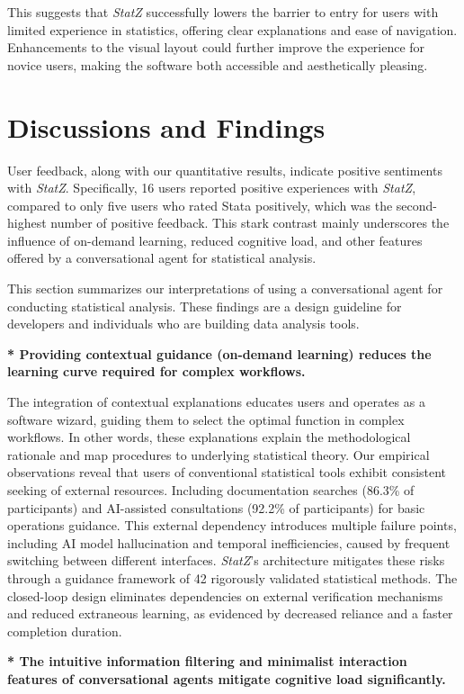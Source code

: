 \documentclass{article}
\begin{document}
This suggests that \textit{StatZ} successfully lowers the barrier to entry for users with limited experience in statistics, offering clear explanations and ease of navigation. Enhancements to the visual layout could further improve the experience for novice users, making the software both accessible and aesthetically pleasing.

\section{Discussions and Findings}
User feedback, along with our quantitative results, indicate positive sentiments with \textit{StatZ}. Specifically, 16 users reported positive experiences with \textit{StatZ}, compared to only five users who rated Stata positively, which was the second-highest number of positive feedback. This stark contrast mainly underscores the influence of on-demand learning, reduced cognitive load, and other features offered by a conversational agent for statistical analysis. 

This section summarizes our interpretations of using a conversational agent for conducting statistical analysis. These findings are a design guideline for developers and individuals who are building data analysis tools.

\textbf{* Providing contextual guidance (on-demand learning) reduces the learning curve required for complex workflows.}

The integration of contextual explanations educates users and operates as a software wizard, guiding them to select the optimal function in complex workflows. In other words, these explanations explain the methodological rationale and map procedures to underlying statistical theory. Our empirical observations reveal that users of conventional statistical tools exhibit consistent seeking of external resources. Including documentation searches (86.3\% of participants) and AI-assisted consultations (92.2\% of participants) for basic operations guidance. This external dependency introduces multiple failure points, including AI model hallucination and temporal inefficiencies, caused by frequent switching between different interfaces. \textit{StatZ}'s architecture mitigates these risks through a guidance framework of 42 rigorously validated statistical methods. The closed-loop design eliminates dependencies on external verification mechanisms and reduced extraneous learning, as evidenced by decreased reliance and a faster completion duration.

\textbf{* The intuitive information filtering and minimalist interaction features of conversational agents mitigate cognitive load significantly.}
\end{document}

